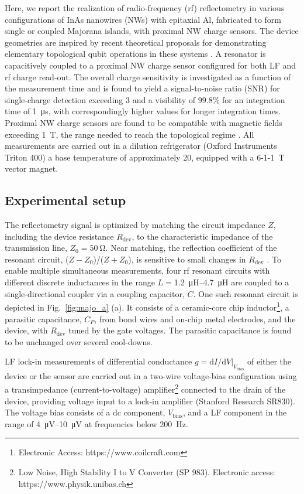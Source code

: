 Here, we report the realization of radio-frequency (rf) reflectometry in various configurations of InAs nanowires (NWs) with epitaxial Al, fabricated to form single or coupled Majorana islands, with proximal NW charge sensors. The device geometries are inspired by recent theoretical proposals for demonstrating elementary topological qubit operations in these systems \cite{AasenPRX16, PhysRevB.94.235446, Plugge, PhysRevB.95.235305}. A resonator is capacitively coupled to a proximal NW charge sensor configured for both LF and rf charge read-out. The overall charge sensitivity is investigated as a function of the measurement time and is found to yield a signal-to-noise ratio (SNR) for single-charge detection exceeding 3 and a visibility of $99.8\%$ for an integration time of \SI{1}{\micro\second}, with correspondingly higher values for longer integration times. Proximal NW charge sensors are found to be compatible with magnetic fields exceeding \SI{1}{\tesla}, the range needed to reach the topological regime \cite{Mourik1003,MT1,nature26142,AlbrechtNature}. All measurements are carried out in a dilution refrigerator (Oxford Instruments Triton 400) a base temperature of approximately \SI{20}{\mk}, equipped with a 6-1-1~\si{\tesla} vector magnet.

\subsection{Experimental setup}

The reflectometry signal is optimized by matching the circuit impedance $Z$, including the device resistance $R_\textrm{dev}$, to the characteristic impedance of the transmission line, $Z_0 = \SI{50}{\ohm}$. Near matching, the reflection coefficient of the resonant circuit, ($Z-Z_{0}$)/($Z+Z_{0}$), is sensitive to small changes in $R_\textrm{dev}$ \cite{Reilly:2007ig,PhysRevApplied.5.034011}. To enable multiple simultaneous measurements, four rf resonant circuits with different discrete inductances in the range $L = $\SIrange{1.2}{4.7}{\micro\henry} are coupled to a single-directional coupler via a coupling capacitor, $C$. One such resonant circuit is depicted in Fig.~\ref{fig:majo_a} (a). It consists of a ceramic-core chip inductor\footnote{Electronic Access: https://www.coilcraft.com},  a parasitic capacitance, $C_P$, from bond wires and on-chip metal electrodes, and the device, with $R_\textrm{dev}$ tuned by the gate voltages. The parasitic capacitance is found to be unchanged over several cool-downs.

LF lock-in measurements of differential conductance $g = \textrm{d}I/\textrm{d}V|_{V_\textrm{bias}}$ of either the device or the sensor are carried out in a two-wire voltage-bias configuration using a transimpedance (current-to-voltage) amplifier\footnote{Low Noise, High Stability I to V Converter (SP 983). Electronic access: https://www.physik.unibas.ch} connected to the drain of the device, providing voltage input to a lock-in amplifier (Stanford Research SR830). The voltage bias consists of a dc component, $V_\textrm{bias}$, and a LF component in the range of \SIrange{4}{10}{\micro\volt} at frequencies below \SI{200}{\hertz}.

